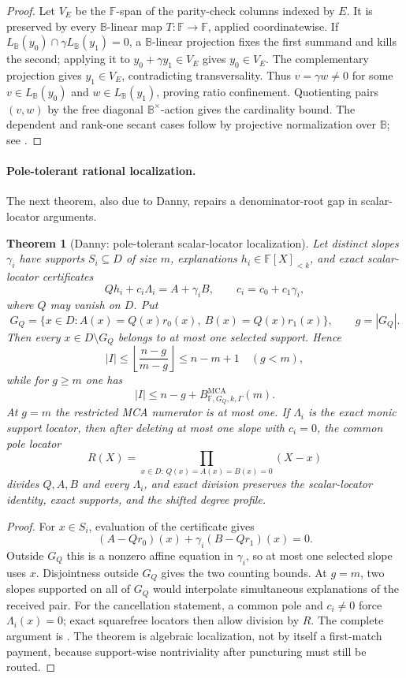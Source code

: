 \documentclass[11pt,a4paper]{amsart}
\numberwithin{equation}{section}
\newtheorem{theorem}{Theorem}[section]
\theoremstyle{remark}
\DeclareMathOperator{\MCA}{MCA}
\newcommand{\F}{\mathbb F}
\newcommand{\B}{\mathbb B}
\newcommand{\floor}[1]{\left\lfloor#1\right\rfloor}
\begin{document}
\begin{proof}
Let $V_E$ be the $\F$-span of the parity-check columns indexed by $E$.  It is preserved by every $\B$-linear map $T:\F\to\F$, applied coordinatewise.  If $L_{\B}(y_0)\cap\gamma L_{\B}(y_1)=0$, a $\B$-linear projection fixes the first summand and kills the second; applying it to $y_0+\gamma y_1\in V_E$ gives $y_0\in V_E$.  The complementary projection gives $y_1\in V_E$, contradicting transversality.  Thus $v=\gamma w\ne0$ for some $v\in L_{\B}(y_0)$ and $w\in L_{\B}(y_1)$, proving ratio confinement.  Quotienting pairs $(v,w)$ by the free diagonal $\B^\times$-action gives the cardinality bound.  The dependent and rank-one secant cases follow by projective normalization over $\B$; see \cite{DannyCoordinateSpan26}.
\end{proof}

\paragraph{Pole-tolerant rational localization.}
The next theorem, also due to Danny, repairs a denominator-root gap in scalar-locator arguments.

\begin{theorem}[Danny: pole-tolerant scalar-locator localization]\label{thm:pole-tolerant}
Let distinct slopes $\gamma_i$ have supports $S_i\subseteq D$ of size $m$, explanations $h_i\in\F[X]_{<k}$, and exact scalar-locator certificates
\[
 Qh_i+c_i\Lambda_i=A+\gamma_iB,
 \qquad c_i=c_0+c_1\gamma_i,
\]
where $Q$ may vanish on $D$.  Put
\[
 G_Q=\{x\in D:A(x)=Q(x)r_0(x),\ B(x)=Q(x)r_1(x)\},\qquad g=|G_Q|.
\]
Then every $x\in D\setminus G_Q$ belongs to at most one selected support.  Hence
\[
 |I|\le\floor{\frac{n-g}{m-g}}\le n-m+1\quad(g<m),
\]
while for $g\ge m$ one has
\[
 |I|\le n-g+B^{\MCA}_{\F,G_Q,k,\Gamma}(m).
\]
At $g=m$ the restricted MCA numerator is at most one.  If $\Lambda_i$ is the exact monic support locator, then after deleting at most one slope with $c_i=0$, the common pole locator
\[
 R(X)=\prod_{x\in D:\,Q(x)=A(x)=B(x)=0}(X-x)
\]
divides $Q,A,B$ and every $\Lambda_i$, and exact division preserves the scalar-locator identity, exact supports, and the shifted degree profile.
\end{theorem}

\begin{proof}
For $x\in S_i$, evaluation of the certificate gives
\[
 (A-Qr_0)(x)+\gamma_i(B-Qr_1)(x)=0.
\]
Outside $G_Q$ this is a nonzero affine equation in $\gamma_i$, so at most one selected slope uses $x$.  Disjointness outside $G_Q$ gives the two counting bounds.  At $g=m$, two slopes supported on all of $G_Q$ would interpolate simultaneous explanations of the received pair.  For the cancellation statement, a common pole and $c_i\ne0$ force $\Lambda_i(x)=0$; exact squarefree locators then allow division by $R$.  The complete argument is \cite{DannyPole26}.  The theorem is algebraic localization, not by itself a first-match payment, because support-wise nontriviality after puncturing must still be routed.
\end{proof}
\end{document}
